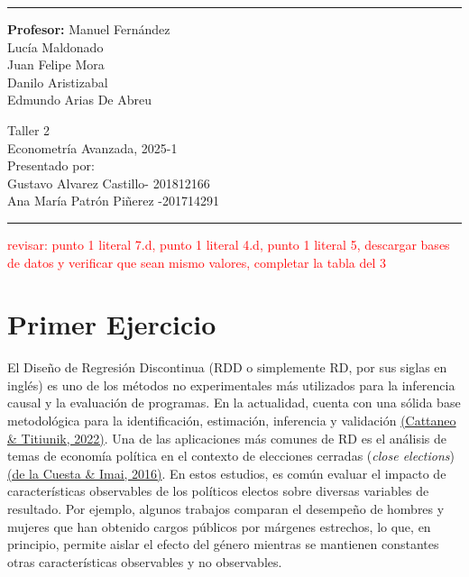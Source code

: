 \documentclass[a4paper, answers, addpoints, 11pt]{exam}
\begin{document}

\fancyhead[C]{}
\hrule \medskip 
\begin{minipage}{0.295\textwidth} 
\raggedright
\textbf{Profesor:} Manuel Fernández\\
\vspace{2mm}
Lucía Maldonado \\
Juan Felipe Mora \\
Danilo Aristizabal \\
Edmundo Arias De Abreu



\end{minipage}
\begin{minipage}{0.4\textwidth} 
\centering 
\huge 
Taller 2\\ 
\vspace{2mm}
\normalsize 
Econometría Avanzada, 2025-1\\ 
\vspace{2mm}
Presentado por: \\Gustavo Alvarez Castillo- 201812166\\
Ana María Patrón Piñerez -201714291

\end{minipage}

\medskip\hrule 
\bigskip
\textcolor{red}{revisar: punto 1 literal 7.d,  punto 1 literal 4.d,  punto 1 literal 5, descargar bases de datos y verificar que sean mismo valores, completar la tabla del 3}
\section*{Primer Ejercicio}

El Diseño de Regresión Discontinua (RDD o simplemente RD, por sus siglas en inglés) es uno de los métodos no experimentales más utilizados para la inferencia causal y la evaluación de programas. En la actualidad, cuenta con una sólida base metodológica para la identificación, estimación, inferencia y validación \href{https://arxiv.org/abs/2108.09400}{(Cattaneo \& Titiunik, 2022)}. Una de las aplicaciones más comunes de RD es el análisis de temas de economía política en el contexto de elecciones cerradas (\textit{close elections}) \href{https://www.annualreviews.org/content/journals/10.1146/annurev-polisci-032015-010115}{(de la Cuesta \& Imai, 2016)}. En estos estudios, es común evaluar el impacto de características observables de los políticos electos sobre diversas variables de resultado. Por ejemplo, algunos trabajos comparan el desempeño de hombres y mujeres que han obtenido cargos públicos por márgenes estrechos, lo que, en principio, permite aislar el efecto del género mientras se mantienen constantes otras características observables y no observables. \\
\end{document}
